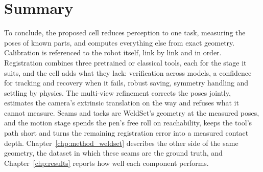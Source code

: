 \section{Summary}
\label{sec:mc_summary}
To conclude, the proposed cell reduces perception to one task, measuring the poses of known parts, and
computes everything else from exact geometry. Calibration is referenced to the robot itself, link by link
and in order. Registration combines three pretrained or classical tools, each for the stage it suits,
and the cell adds what they lack: verification across models, a confidence for tracking and recovery
when it fails, robust saving, symmetry handling and settling by physics. The multi-view refinement
corrects the poses jointly, estimates the camera's extrinsic translation on the way and refuses what it
cannot measure. Seams and tacks are WeldSet's geometry at the measured poses, and the motion stage spends
the pen's free roll on reachability, keeps the tool's path short and turns the remaining registration
error into a measured contact depth. Chapter~\ref{chp:method_weldset} describes the other side of the same
geometry, the dataset in which these seams are the ground truth, and Chapter~\ref{chp:results} reports
how well each component performs.
